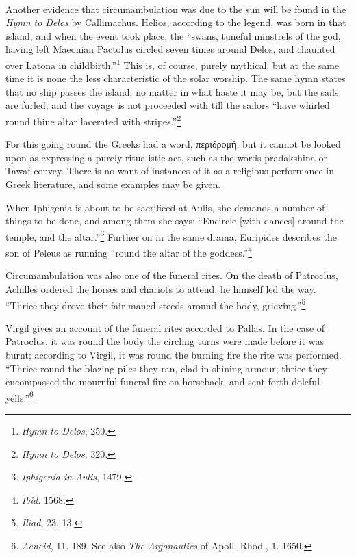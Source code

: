 \documentclass[a4paper, 11pt, oneside, polutonikogreek, english]{article}
\begin{document}
\paragraph{}
Another evidence that circumambulation was due to the sun will be found in the \emph{Hymn to Delos} by Callimachus. Helios, according to the legend, was born in that island, and when the event took place, the ``swans, tuneful minstrels of the god, having left Maeonian Pactolus circled seven times around Delos, and chaunted over Latona in childbirth.''\footnote{\emph{Hymn to Delos}, 250.} This is, of course, purely mythical, but at the same time it is none the less characteristic of the solar worship. The same hymn states that no ship passes the island, no matter in what haste it may be, but the sails are furled, and the voyage is not proceeded with till the sailors ``have whirled round thine altar lacerated with stripes.''\footnote{\emph{Hymn to Delos}, 320.}

For this going round the Greeks had a word, περιδρομή, but it cannot be looked upon as expressing a purely ritualistic act, such as the words pradakshina or Tawaf convey. There is no want of instances of it as a religious performance in Greek literature, and some examples may be given.

When Iphigenia is about to be sacrificed at Aulis, she demands a number of things to be done, and among them she says: ``Encircle [with dances] around the temple, and the altar.''\footnote{\emph{Iphigenia in Aulis}, 1479.} Further on in the same drama, Euripides describes the son of Peleus as running ``round the altar of the goddess.''\footnote{\emph{Ibid.} 1568.}

Circumambulation was also one of the funeral rites. On the death of Patroclus, Achilles ordered the horses and chariots to attend, he himself led the way. ``Thrice they drove their fair-maned steeds around the body, grieving.''\footnote{\emph{Iliad}, 23. 13.}

Virgil gives an account of the funeral rites accorded to Pallas. In the case of Patroclus, it was round the body the circling turns were made before it was burnt; according to Virgil, it was round the burning fire the rite was performed. ``Thrice round the blazing piles they ran, clad in shining armour; thrice they encompassed the mournful funeral fire on horseback, and sent forth doleful yells.''\footnote{\emph{Aeneid}, 11. 189. See also \emph{The Argonautics} of Apoll. Rhod., 1. 1650.}
\end{document}
